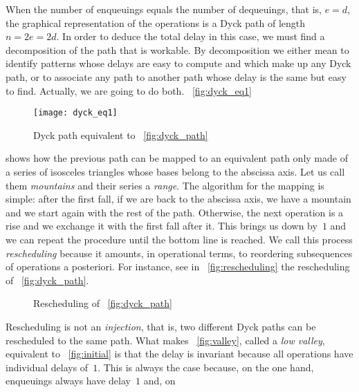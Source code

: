 When the number of enqueuings equals the number of dequeuings, that
is, \({e=d}\), the graphical representation of the operations is a
Dyck path of length \(n=2e=2d\). In order to deduce the total delay in
this case, we must find a decomposition of the path that is
workable. By decomposition we either mean to identify patterns whose
delays are easy to compute and which make up any Dyck path, or to
associate any path to another path whose delay is the same but easy to
find. Actually, we are going to do both. \Fig~\vref{fig:dyck_eq1}
\begin{figure}[b]
\centering
\texttt{[image: dyck\_eq1]}
\caption{Dyck path equivalent to \fig~\vref{fig:dyck_path}
\label{fig:dyck_eq1}}
\end{figure}
shows how the previous path can be mapped to an equivalent path only
made of a series of isosceles triangles whose bases belong to the
abscissa axis. Let us call them \emph{mountains} and their series a
\emph{range}. The algorithm for the mapping is simple: after the first
fall, if we are back to the abscissa axis, we have a mountain and we
start again with the rest of the path. Otherwise, the next operation
is a rise and we exchange it with the first fall after it. This brings
us down by~\(1\) and we can repeat the procedure until the bottom line
is reached. We call this process \emph{rescheduling} because it
amounts, in operational terms, to reordering subsequences of
operations a posteriori. For instance, see in
\fig~\vref{fig:rescheduling} the rescheduling of
\fig~\vref{fig:dyck_path}.
\begin{figure}
\centering
{}
\qquad
{}
\qquad
{}
\qquad
{}
\caption{Rescheduling of \fig~\vref{fig:dyck_path}\label{fig:rescheduling}}
\end{figure}
Rescheduling is not an \emph{injection}, that is, two different Dyck
paths can be rescheduled to the same path. What makes
\fig~\vref{fig:valley}, called a \emph{low valley}, equivalent to
\fig~\vref{fig:initial} is that the delay is invariant because all
operations have individual delays of~\(1\). This is always the case
because, on the one hand, enqueuings always have delay~\(1\) and, on
